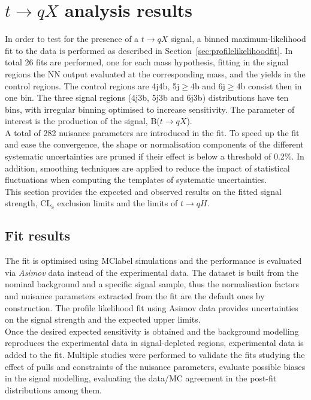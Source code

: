 \chapter{$t\to qX$ analysis results}
\label{chapter:tqXresults}

In order to test for the presence of a $t\to qX$ signal, a binned maximum-likelihood fit to the data is performed as described in Section~\ref{sec:profilelikelihoodfit}. In total 26 fits are performed, one for each mass hypothesis, fitting in the signal regions the NN output evaluated at the corresponding mass, and the yields in the control regions. The control regions are 4j4b, 5j$\geq$4b and 6j$\geq$4b consist then in one bin. The three signal regions (4j3b, 5j3b and 6j3b) distributions have ten bins, with irregular binning optimised to increase sensitivity. The parameter of interest is the production of the signal, B($t\to qX$).\\

A total of 282 nuisance parameters are introduced in the fit. To speed up the fit and ease the convergence, the shape or normalisation components of the different systematic uncertainties are pruned if their effect is below a threshold of 0.2\%. In addition, smoothing techniques are applied to reduce the impact of statistical fluctuations when computing the templates of systematic uncertainties.\\

This section provides the expected and observed results on the fitted signal strength, CL$_{\text{s}}$ exclusion limits and the limits of $t\to qH$.

\section{Fit results}

The fit is optimised using \acrshort{MClabel} simulations and the performance is evaluated via \textit{Asimov} data instead of the experimental data. The dataset is built from the nominal background and a specific signal sample, thus the normalisation factors and nuisance parameters extracted from the fit are the default ones by construction. The profile likelihood fit using Asimov data provides uncertainties on the signal strength and the expected upper limits.\\

Once the desired expected sensitivity is obtained and the background modelling reproduces the experimental data in signal-depleted regions, experimental data is added to the fit. Multiple studies were performed to validate the fits studying the effect of pulls and constraints of the nuisance parameters, evaluate possible biases in the signal modelling, evaluating the data/MC agreement in the post-fit distributions among them.\\

